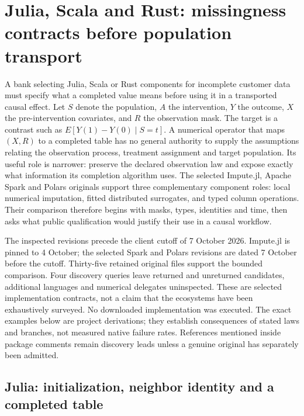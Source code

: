 \section[Remaining-language transport and missingness contracts]{Julia, Scala and Rust: missingness contracts before population transport}
\label{sec:exec25-otm}

A bank selecting Julia, Scala or Rust components for incomplete customer data must specify what a completed value means before using it in a transported causal effect. Let $S$ denote the population, $A$ the intervention, $Y$ the outcome, $X$ the pre-intervention covariates, and $R$ the observation mask. The target is a contrast such as $E[Y(1)-Y(0)\mid S=t]$. A numerical operator that maps $(X,R)$ to a completed table has no general authority to supply the assumptions relating the observation process, treatment assignment and target population. Its useful role is narrower: preserve the declared observation law and expose exactly what information its completion algorithm uses. The selected Impute.jl, Apache Spark and Polars originals support three complementary component roles: local numerical imputation, fitted distributed surrogates, and typed column operations. Their comparison therefore begins with masks, types, identities and time, then asks what public qualification would justify their use in a causal workflow.~\citep{exec25_otm_imputejl,exec25_otm_spark,exec25_otm_polars,exec25_otm_choice}

The inspected revisions precede the client cutoff of 7 October 2026. Impute.jl is pinned to 4 October; the selected Spark and Polars revisions are dated 7 October before the cutoff. Thirty-five retained original files support the bounded comparison. Four discovery queries leave returned and unreturned candidates, additional languages and numerical delegates uninspected. These are selected implementation contracts, not a claim that the ecosystems have been exhaustively surveyed. No downloaded implementation was executed. The exact examples below are project derivations; they establish consequences of stated laws and branches, not measured native failure rates. References mentioned inside package comments remain discovery leads unless a genuine original has separately been admitted.~\citep{exec25_otm_choice}

\subsection{Julia: initialization, neighbor identity and a completed table}

